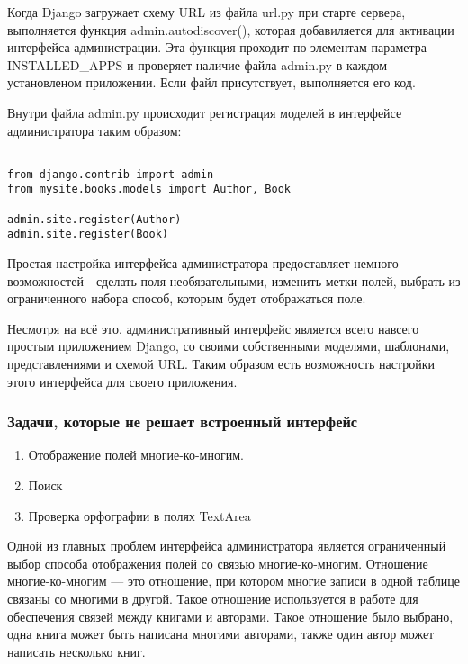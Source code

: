 Когда Django загружает схему URL из файла url.py  при старте сервера, выполняется функция admin.autodiscover(), которая добавиляется для активации интерфейса администрации. Эта функция проходит по элементам параметра INSTALLED\_APPS и проверяет наличие файла admin.py в каждом установленом приложении. Если файл присутствует, выполняется его код. 

Внутри файла admin.py происходит регистрация моделей в интерфейсе администратора таким образом: 

{
\small \begin{verbatim}

from django.contrib import admin
from mysite.books.models import Author, Book

admin.site.register(Author)
admin.site.register(Book)

\end{verbatim}
}

Простая настройка интерфейса администратора предоставляет немного возможностей - сделать поля необязательными, изменить метки полей, выбрать из ограниченного набора способ, которым будет отображаться поле.

Несмотря на всё это, административный интерфейс является всего навсего простым приложением Django, со своими собственными моделями, шаблонами, представлениями и схемой URL. Таким образом есть возможность настройки этого интерфейса для своего приложения.

\subsubsection{Задачи, которые не решает встроенный интерфейс}
\begin{enumerate}
	\item Отображение полей многие-ко-многим.
	\item Поиск
	\item Проверка орфографии в полях TextArea
\end{enumerate}

Одной из главных проблем интерфейса администратора является ограниченный выбор способа отображения полей со связью многие-ко-многим. Отношение многие-ко-многим  --- это отношение, при котором многие записи в одной таблице связаны со многими в другой. Такое отношение используется в работе для обеспечения связей между книгами и авторами. Такое отношение было выбрано, \tk одна книга может быть написана многими авторами, также один автор может написать несколько книг. 

